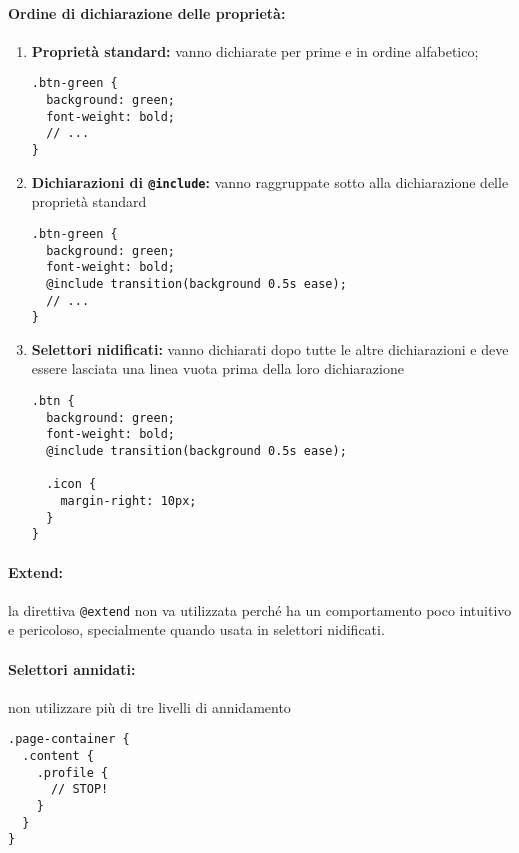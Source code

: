 \documentclass[../ProcessiPrimari.tex]{subfiles}
\begin{document}
\paragraph*{Ordine di dichiarazione delle proprietà:}
\begin{enumerate}
	\item \textbf{Proprietà standard:} vanno dichiarate per prime e in ordine alfabetico;
\begin{center}{
\begin{minipage}{5cm}
\begin{Verbatim}[frame=single]
.btn-green {
  background: green;
  font-weight: bold;
  // ...
}
\end{Verbatim}
\end{minipage}
}
\end{center}
	\item \textbf{Dichiarazioni di \texttt{@include}:} vanno raggruppate sotto alla dichiarazione delle proprietà standard
\begin{center}{
\begin{minipage}{10cm}
\begin{Verbatim}[frame=single]
.btn-green {
  background: green;
  font-weight: bold;
  @include transition(background 0.5s ease);
  // ...
}
\end{Verbatim}
\end{minipage}
}
\end{center}
\item \textbf{Selettori nidificati:} vanno dichiarati dopo tutte le altre dichiarazioni e deve essere lasciata una linea vuota prima della loro dichiarazione
\begin{center}{
\begin{minipage}{10cm}
\begin{Verbatim}[frame=single]
.btn {
  background: green;
  font-weight: bold;
  @include transition(background 0.5s ease);

  .icon {
    margin-right: 10px;
  }
}
\end{Verbatim}
\end{minipage}
}
\end{center}
\end{enumerate}
\paragraph*{Extend:}
la direttiva \texttt{@extend} non va utilizzata perché ha un comportamento poco intuitivo e pericoloso, specialmente quando usata in selettori nidificati.
\paragraph*{Selettori annidati: }
non utilizzare più di tre livelli di annidamento
\begin{center}{
\begin{minipage}{5cm}
\begin{Verbatim}[frame=single]
.page-container {
  .content {
    .profile {
      // STOP!
    }
  }
}
\end{Verbatim}
\end{minipage}
}
\end{center}

	
\end{document}
